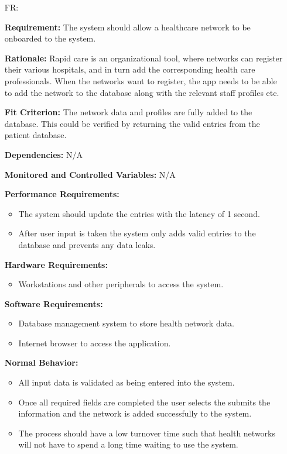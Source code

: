 \documentclass[12pt]{article}
\newcounter{reqnum} %
\begin{document}
\noindent \begin{itemize}

\item [FR\refstepcounter{reqnum}\thereqnum \label{FR_addHealthNetwork}:] 

\textbf{Requirement:} The system should allow a healthcare network to be onboarded to the system.

\textbf{Rationale:} Rapid care is an organizational tool, where networks can register their various hospitals, and in turn add the corresponding health care professionals. When the networks want to register, the app needs to be able to add the network to the database along with the relevant staff profiles etc.

\textbf{Fit Criterion:} The network data and profiles are fully added to the database. This could be verified by returning the valid entries from the patient database.

\textbf{Dependencies:} N/A

\textbf{Monitored and Controlled Variables:} N/A

\textbf{Performance Requirements:} 
\begin{itemize}
  \item The system should update the entries with the latency of 1 second.
  \item After user input is taken the system only adds valid entries to the database and prevents any data leaks.
\end{itemize}

\textbf{Hardware Requirements:} 
\begin{itemize}
  \item Workstations and other peripherals to access the system.
\end{itemize}

\textbf{Software Requirements:} 
\begin{itemize}
  \item Database management system to store health network data.
  \item Internet browser to access the application.
\end{itemize}

\textbf{Normal Behavior:} 
\begin{itemize}
  \item All input data is validated as being entered into the system.
  \item Once all required fields are completed the user selects the submits the information and the network is added successfully to the system.
  \item The process should have a low turnover time such that health networks will not have to spend a long time waiting to use the system.
\end{itemize}


\end{itemize}
\end{document}
